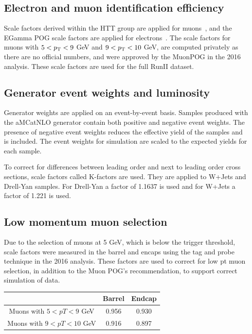\subsection{Electron and muon identification efficiency}

Scale factors derived within the HTT group are applied for muons~\cite{SMHTTarXiv}, and the EGamma POG scale factors are applied for electrons~\cite{EGammaMVAID}. The scale factors for muons with $5<p_{\mathrm{T}}<9$ GeV and $9<p_{\mathrm{T}}<10$ GeV, are computed privately as there are no official numbers, and were approved by the MuonPOG in the 2016 analysis. These scale factors are used for the full RunII dataset. 
  


\subsection{Generator event weights and luminosity}

Generator weights are applied on an event-by-event basis. Samples produced with the aMCatNLO generator contain both positive and negative event weights. The presence of negative event weights reduces the effective yield of the samples and is included.
The event weights for simulation are scaled to the expected yields for each sample. 

To correct for differences between leading order and next to leading order cross sections, scale factors called K-factors are used. They are applied to W+Jets and Drell-Yan samples. For Drell-Yan a factor of 1.1637 is used and for W+Jets a factor of 1.221 is used.

\subsection{Low momentum muon selection}
Due to the selection of muons at 5 GeV, which is below the trigger threshold, scale factors were measured in the barrel and encaps using the tag and probe technique in the 2016 analysis. These factors are used to correct for low pt muon selection, in addition to the Muon POG's recommendation, to support correct simulation of data. 
\begin{table}[h!tbp]
\centering
{}
\begin{tabular*}{0.6\textwidth}{c|c|c}
   & Barrel & Endcap \\\hline
Muons with $5 < pT < 9$ GeV & 0.956 & 0.930\\\hline
Muons with $9 < pT < 10$ GeV & 0.916 & 0.897\\\hline 
\end{tabular*}
\end{table}


